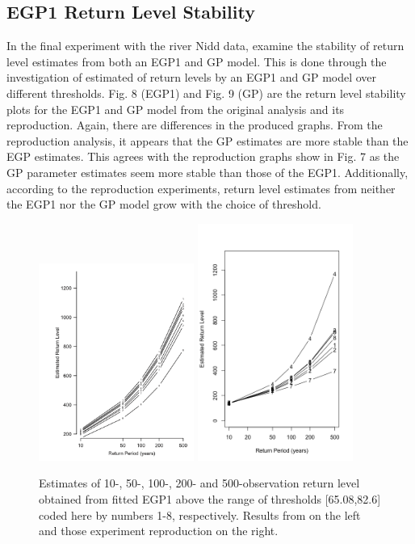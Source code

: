 \documentclass[12pt]{article}
\theoremstyle{definition}
\theoremstyle{definition}
\begin{document}
\subsection{EGP1 Return Level Stability}
In the final experiment with the river Nidd data, \cite{papatawn} examine the stability of return level estimates from both an EGP1 and GP model. This is done through the investigation of estimated of return levels by an EGP1 and GP model over different thresholds. Fig. 8 (EGP1) and Fig. 9 (GP) are the return level stability plots for the EGP1 and GP model from the original analysis and its reproduction. Again, there are differences in the produced graphs. From the reproduction analysis, it appears that the GP estimates are more stable than the EGP estimates. This agrees with the reproduction graphs show in Fig. 7 as the GP parameter estimates seem more stable than those of the EGP1. Additionally, according to the reproduction experiments, return level estimates from neither the EGP1 nor the GP model grow with the choice of threshold.
\begin{figure}[H]
\begin{center}
{\includegraphics[width=2.0in]{project/papafiles/fig6.papa.egp1.png}}
{\includegraphics[width=2.0in]{project/papafiles/fig6.me.egp1.png}}
\caption{Estimates of 10-, 50-, 100-, 200- and 500-observation return level obtained from fitted EGP1 above the range of thresholds [65.08,82.6] coded here by numbers 1-8, respectively. Results from \cite{papatawn} on the left and those experiment reproduction on the right.}
\end{center}
\end{figure}
\end{document}
